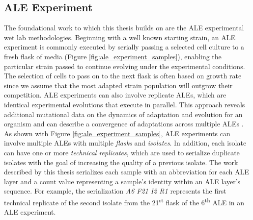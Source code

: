 \documentclass[12pt,final,masters,chapterheads]{ucsd}  %
\begin{document}
\subsection{ALE Experiment}
%
%

%
%
The foundational work to which this thesis builds on are the ALE experimental wet lab methodologies. Beginning with a well known starting strain, an ALE experiment is commonly executed by serially passing a selected cell culture to a fresh flask of media (Figure \ref{fig:ale_experiment_samples}), enabling the particular strain passed to continue evolving under the experimental conditions. The selection of cells to pass on to the next flask is often based on growth rate since we assume that the most adapted strain population will outgrow their competition. ALE experiments can also involve replicate ALEs, which are identical experimental evolutions that execute in parallel. This approach reveals additional mutational data on the dynamics of adaptation and evolution for an organism and can describe a convergence of adaptations across multiple ALEs \cite{sys_bio_book}. As shown with Figure \ref{fig:ale_experiment_samples}, ALE experiments can involve multiple ALEs with multiple \textit{flasks} and \textit{isolates}. In addition, each isolate can have one or more \textit{technical replicates}, which are used to serialize duplicate isolates with the goal of increasing the quality of a previous isolate. The work described by this thesis serializes each sample with an abbreviation for each ALE layer and a count value representing a sample's identity within an ALE layer's sequence. For example, the serialization \textit{A6 F21 I2 R1} represents the first technical replicate of the second isolate from the 21\textsuperscript{st} flask of the 6\textsuperscript{th} ALE in an ALE experiment.
\end{document}
